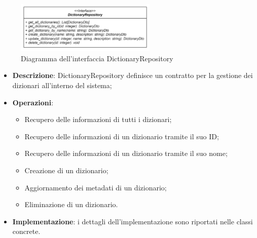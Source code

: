  \label{DictionaryRepository}
\begin{figure}[H]
    \centering
    \includegraphics[width=0.6\textwidth]{assets/Backend/dictionary_repository.png}
    \caption{Diagramma dell'interfaccia DictionaryRepository}
  \end{figure}
\begin{itemize}
  \item \textbf{Descrizione}: DictionaryRepository definisce un contratto per la gestione dei dizionari all'interno del sistema; 
  \item \textbf{Operazioni}: 
    \begin{itemize}
      \item Recupero delle informazioni di tutti i dizionari;
      \item Recupero delle informazioni di un dizionario tramite il suo ID;
      \item Recupero delle informazioni di un dizionario tramite il suo nome;
      \item Creazione di un dizionario;
      \item Aggiornamento dei metadati di un dizionario;
      \item Eliminazione di un dizionario.
    \end{itemize}
  \item \textbf{Implementazione}: i dettagli dell'implementazione sono riportati nelle classi concrete.
\end{itemize} 

